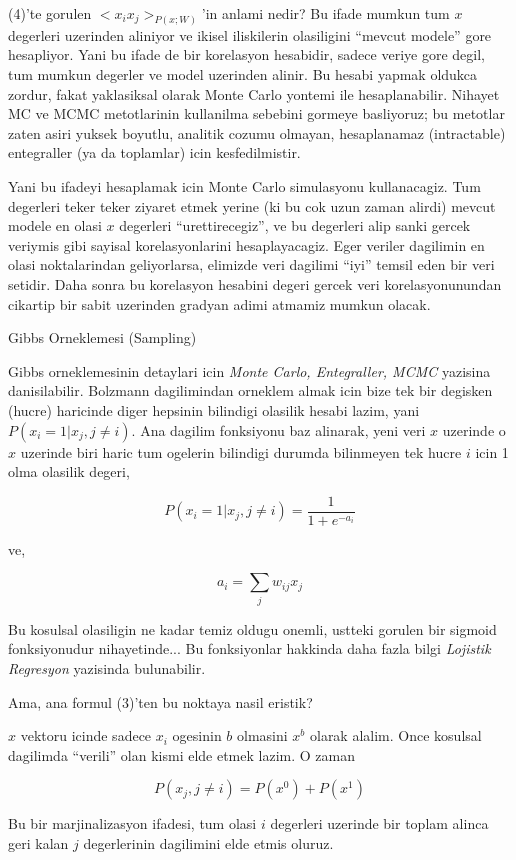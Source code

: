 \documentclass[12pt,fleqn]{article}\usepackage{../common}
\begin{document}
(4)'te gorulen $<x_ix_j>_{P(x;W)}$'in anlami nedir? Bu ifade mumkun tum $x$
degerleri uzerinden aliniyor ve ikisel iliskilerin olasiligini ``mevcut
modele'' gore hesapliyor. Yani bu ifade de bir korelasyon hesabidir, sadece
veriye gore degil, tum mumkun degerler ve model uzerinden alinir. Bu hesabi
yapmak oldukca zordur, fakat yaklasiksal olarak Monte Carlo yontemi ile
hesaplanabilir. Nihayet MC ve MCMC metotlarinin kullanilma sebebini gormeye
basliyoruz; bu metotlar zaten asiri yuksek boyutlu, analitik cozumu
olmayan, hesaplanamaz (intractable) entegraller (ya da toplamlar) icin
kesfedilmistir. 

Yani bu ifadeyi hesaplamak icin Monte Carlo simulasyonu kullanacagiz. Tum
degerleri teker teker ziyaret etmek yerine (ki bu cok uzun zaman alirdi)
mevcut modele en olasi $x$ degerleri ``urettirecegiz'', ve bu degerleri
alip sanki gercek veriymis gibi sayisal korelasyonlarini
hesaplayacagiz. Eger veriler dagilimin en olasi noktalarindan geliyorlarsa,
elimizde veri dagilimi ``iyi'' temsil eden bir veri setidir. Daha sonra bu
korelasyon hesabini degeri gercek veri korelasyonunundan cikartip bir sabit
uzerinden gradyan adimi atmamiz mumkun olacak.

Gibbs Orneklemesi (Sampling)

Gibbs orneklemesinin detaylari icin {\em Monte Carlo, Entegraller, MCMC}
yazisina danisilabilir. Bolzmann dagilimindan orneklem almak icin bize tek
bir degisken (hucre) haricinde diger hepsinin bilindigi olasilik hesabi
lazim, yani $P(x_i = 1 | x_j, j \ne i)$.  Ana dagilim fonksiyonu baz
alinarak, yeni veri $x$ uzerinde o $x$ uzerinde biri haric tum ogelerin
bilindigi durumda bilinmeyen tek hucre $i$ icin 1 olma olasilik degeri,

$$ P(x_i = 1 | x_j, j \ne i) = \frac{1}{1 + e^{-a_i}} $$

ve,

$$ a_i = \sum_j  w_{ij}x_j $$

Bu kosulsal olasiligin ne kadar temiz oldugu onemli, ustteki gorulen bir
sigmoid fonksiyonudur nihayetinde... Bu fonksiyonlar hakkinda daha fazla
bilgi {\em Lojistik Regresyon} yazisinda bulunabilir. 

Ama, ana formul (3)'ten bu noktaya nasil eristik?

$x$ vektoru icinde sadece $x_i$ ogesinin $b$ olmasini $x^b$ olarak
alalim. Once kosulsal dagilimda ``verili'' olan kismi elde etmek lazim. O
zaman

$$ P(x_j,j \ne i) = P(x^0) + P(x^1) $$

Bu bir marjinalizasyon ifadesi, tum olasi $i$ degerleri uzerinde bir toplam
alinca geri kalan $j$ degerlerinin dagilimini elde etmis oluruz. 
\end{document}
